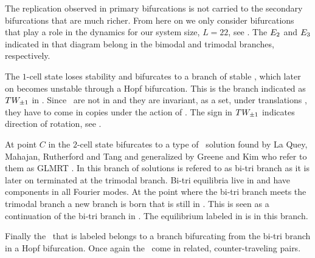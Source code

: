 The replication observed in primary bifurcations is not carried to the secondary bifurcations that are
much richer. From here on we only consider bifurcations that play a role in the dynamics for our system size, $L=22$, see . The $E_{2}$ and $E_{3}$ indicated in that diagram belong
in the bimodal and trimodal branches, respectively.

The $1$-cell state loses stability and bifurcates to a branch of stable
\reqva, which later on becomes unstable through a Hopf bifurcation. 
This is the branch indicated as $TW_{\pm1}$ in . Since \reqva\ are not in 
and they are invariant, as a set, under translations , they have to come in copies
under the action of . The sign in $TW_{\pm1}$ indicates direction of rotation, see .

At point $C$ in  the $2$-cell state bifurcates to a type of
\eqv\ solution found by La Quey, Mahajan, Rutherford and Tang and generalized by Greene and Kim who refer to them as GLMRT \eqva. In  this branch of solutions is refered to as bi-tri branch as it is later on terminated at the trimodal branch. Bi-tri equilibria live in  and have components
in all Fourier modes. At the point where the bi-tri branch
meets the trimodal branch a new branch is born that is still in . This is seen as a continuation
of the bi-tri branch in . The equilibrium labeled  in  is in
this branch.

Finally the \reqv\ that is labeled  belongs to a branch bifurcating from the bi-tri branch in
a Hopf bifurcation. Once again the \reqva\ come in  related, counter-traveling pairs.




